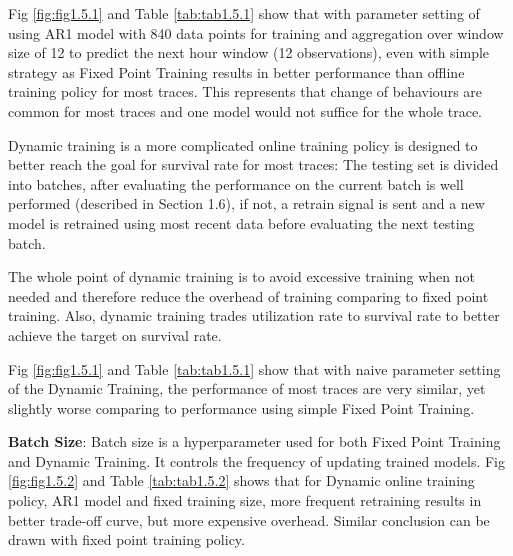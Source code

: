 \documentclass{article}
\begin{document}
\begin{flushleft}
Fig \ref{fig:fig1.5.1} and Table \ref{tab:tab1.5.1} show that with parameter
setting of using AR1 model with 840 data points for training and aggregation
over window size of 12 to predict the next hour window (12 observations), even
with simple strategy as Fixed Point Training results in better performance than
offline training policy for most traces. This represents that change of
behaviours are common for most traces and one model would not suffice for the
whole trace.
\end{flushleft}

\begin{flushleft}
Dynamic training is a more complicated online training policy is designed to
better reach the goal for survival rate for most traces: The testing set is
divided into batches, after evaluating the performance on the current batch is
well performed (described in Section 1.6), if not, a retrain signal is sent and
a new model is retrained using most recent data before evaluating the next
testing batch. 

The whole point of dynamic training is to avoid excessive training when not
needed and therefore reduce the overhead of training comparing to fixed point
training. Also, dynamic training trades utilization rate to survival rate to
better achieve the target on survival rate.

Fig \ref{fig:fig1.5.1} and Table \ref{tab:tab1.5.1} show that with naive
parameter setting of the Dynamic Training, the performance of most traces are
very similar, yet slightly worse comparing to performance using simple Fixed
Point Training.
\end{flushleft}

\begin{flushleft}
\textbf{Batch Size}: Batch size is a hyperparameter used for both Fixed Point
Training and Dynamic Training. It controls the frequency of updating trained
models. Fig \ref{fig:fig1.5.2} and Table \ref{tab:tab1.5.2} shows that for
Dynamic online training policy, AR1 model and fixed training size, more frequent
retraining results in better trade-off curve, but more expensive overhead.
Similar conclusion can be drawn with fixed point training policy.
\end{flushleft}
\end{document}
